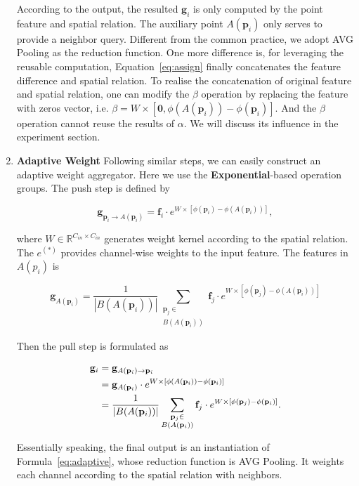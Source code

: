 \documentclass[journal]{IEEEtran}
\begin{document}
\begin{enumerate}
    According to the output, the resulted $\mathbf{g}_i$ is only computed by the point feature and spatial relation. The auxiliary point $A(\mathbf{p}_i)$ only serves to provide a neighbor query. Different from the common practice, we adopt AVG Pooling as the reduction function. One more difference is, for leveraging the reusable computation, Equation~\ref{eq:assign} finally concatenates the feature difference and spatial relation. To realise the concatenation of original feature and spatial relation, one can modify the $\beta$ operation by replacing the feature with zeros vector, i.e. $\beta=W\times[\mathbf{0}, \phi(A(\mathbf{p}_i))-\phi(\mathbf{p}_i)]$. And the $\beta$ operation cannot reuse the results of $\alpha$. We will discuss its influence in the experiment section.
    
    \item {\bf Adaptive Weight} Following similar steps, we can easily construct an adaptive weight aggregator. Here we use the {\bf Exponential}-based operation groups. The push step is defined by
    
    \begin{equation}
        \mathbf{g}_{\mathbf{p}_i\to A(\mathbf{p}_i)}=\mathbf{f}_i\cdot e^{W\times[\phi(\mathbf{p}_i)-\phi(A(\mathbf{p}_i))]},
    \end{equation}
    
    \noindent
    where $W\in\mathbb{R}^{C_{in}\times C_{in}}$ generates weight kernel according to the spatial relation. The $e^{(*)}$ provides channel-wise weights to the input feature. The features in $A(p_i)$ is 
    
    \begin{equation}
        \mathbf{g}_{A(\mathbf{p}_i)}=\frac{1}{|B(A(\mathbf{p}_i))|}\sum_{\substack{\mathbf{p}_j\in \\B(A(\mathbf{p}_i))}}\mathbf{f}_j\cdot e^{W\times[\phi(\mathbf{p}_j)-\phi(A(\mathbf{p}_i))]}
    \end{equation}
    
    Then the pull step is formulated as 
    
    \begin{align}
    \mathbf{g}_i&=\mathbf{g}_{A(\mathbf{p}_i)\to \mathbf{p}_i} \notag\\
    &=\mathbf{g}_{A(\mathbf{p}_i)}\cdot e^{W\times[\phi(A(\mathbf{p}_i))-\phi(\mathbf{p}_i)]}\notag \\
    &=\frac{1}{|B(A(\mathbf{p}_i))|}\sum_{\substack{\mathbf{p}_j\in \\B(A(\mathbf{p}_i))}}\mathbf{f}_j\cdot e^{W\times[\phi(\mathbf{p}_j)-\phi(\mathbf{p}_i)]}\label{eq:expassign}.
\end{align}

    \noindent
    Essentially speaking, the final output is an instantiation of Formula~\ref{eq:adaptive}, whose reduction function is AVG Pooling. It weights each channel according to the spatial relation with neighbors.
    
\end{enumerate}
\end{document}
